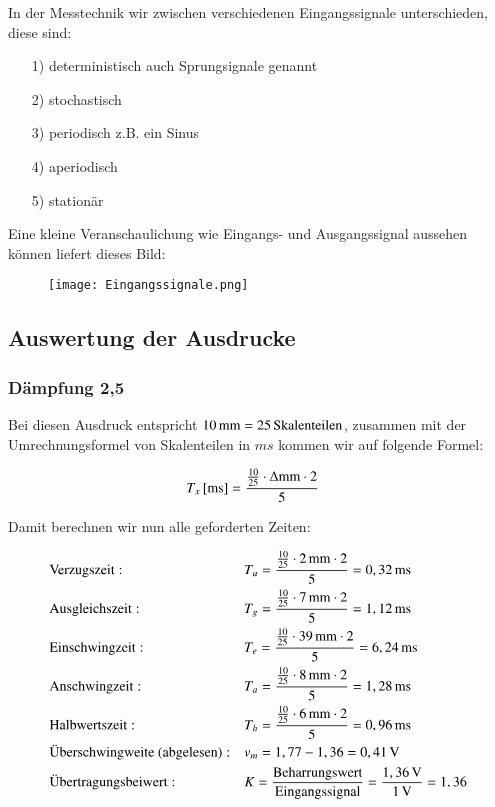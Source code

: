 In der Messtechnik wir zwischen verschiedenen Eingangssignale unterschieden, diese sind:

\begin{itemize}
\item[1)] deterministisch auch Sprungsignale genannt
\item[2)] stochastisch
\item[3)] periodisch z.B. ein Sinus
\item[4)] aperiodisch
\item[5)] stationär
\end{itemize}

Eine kleine Veranschaulichung wie Eingangs- und Ausgangssignal aussehen können liefert dieses Bild:

\begin{figure}[h]
\centering
\texttt{[image: Eingangssignale.png]}
\end{figure}


\subsection{Auswertung der Ausdrucke}


\subsubsection*{Dämpfung 2,5}

Bei diesen Ausdruck entspricht $\unit[10]{mm} = \unit[25]{Skalenteilen}$, zusammen mit der Umrechnungsformel von Skalenteilen in $ms$ kommen wir auf folgende Formel:

\begin{align*}
\unit[T_x]{[ms]} &= \frac{ \frac{10}{25} \cdot \Delta \text{mm} \cdot 2}{5}
\end{align*}

Damit berechnen wir nun alle geforderten Zeiten:

\begin{align*}
&\text{Verzugszeit}:  &&T_u = \frac{ \frac{10}{25} \cdot \unit[2]{mm} \cdot 2}{5} = \unit[0,32]{ms} \\
&\text{Ausgleichszeit}:  &&T_g = \frac{ \frac{10}{25} \cdot \unit[7]{mm} \cdot 2}{5} = \unit[1,12]{ms} \\
&\text{Einschwingzeit}:  &&T_e = \frac{ \frac{10}{25} \cdot \unit[39]{mm} \cdot 2}{5} = \unit[6,24]{ms} \\
&\text{Anschwingzeit}:  &&T_a = \frac{ \frac{10}{25} \cdot \unit[8]{mm} \cdot 2}{5} = \unit[1,28]{ms} \\
&\text{Halbwertszeit}:  &&T_h = \frac{ \frac{10}{25} \cdot \unit[6]{mm} \cdot 2}{5} = \unit[0,96]{ms} \\
&\text{Überschwingweite (abgelesen)}:  &&v_m = 1,77 - 1,36 = \unit[0,41]{V} \\
&\text{Übertragungsbeiwert}:  &&K = \frac{\text{Beharrungswert}}{\text{Eingangssignal}} = \frac{\unit[1,36]{V}}{\unit[1]{V}} = \unit[1,36]{ } \\
\end{align*}


